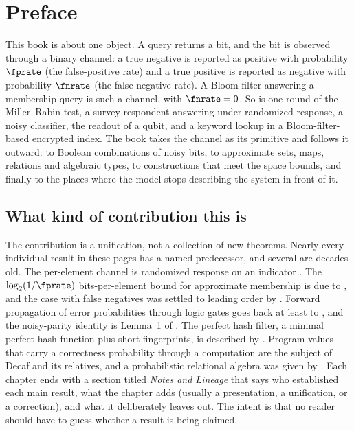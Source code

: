 \chapter*{Preface}
\label{ch:preface}

This book is about one object. A query returns a bit, and the bit is
observed through a binary channel: a true negative is reported as positive
with probability $\fprate$ (the false-positive rate) and a true positive is
reported as negative with probability $\fnrate$ (the false-negative rate).
A Bloom filter answering a membership query is such a channel, with
$\fnrate = 0$. So is one round of the Miller--Rabin test, a survey respondent
answering under randomized response, a noisy classifier, the readout of a
qubit, and a keyword lookup in a Bloom-filter-based encrypted index. The book
takes the channel as its primitive and follows it outward: to Boolean
combinations of noisy bits, to approximate sets, maps, relations and algebraic
types, to constructions that meet the space bounds, and finally to the places
where the model stops describing the system in front of it.

\section*{What kind of contribution this is}

The contribution is a unification, not a collection of new theorems. Nearly
every individual result in these pages has a named predecessor, and several
are decades old. The per-element channel is randomized response on an
indicator \parencite{warner-1965}. The $\log_2(1/\fprate)$ bits-per-element
bound for approximate membership is due to \textcite{carter-et-al-1978}, and
the case with false negatives was settled to leading order by
\textcite{pagh-rodler-2001}. Forward propagation of error probabilities
through logic gates goes back at least to \textcite{parker-mccluskey-1975},
and the noisy-parity identity is Lemma~1 of \textcite{gallager-1962}. The
perfect hash filter, a minimal perfect hash function plus short fingerprints,
is described by \textcite{dietzfelbinger-pagh-2008}. Program values that carry
a correctness probability through a computation are the subject of Decaf
\parencite{boston-et-al-2015} and its relatives, and a probabilistic relational
algebra was given by \textcite{fuhr-roelleke-1997}. Each chapter ends with a
section titled \emph{Notes and Lineage} that says who established each main
result, what the chapter adds (usually a presentation, a unification, or a
correction), and what it deliberately leaves out. The intent is that no reader
should have to guess whether a result is being claimed.

